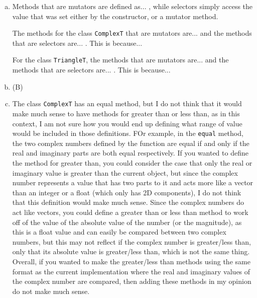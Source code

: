 \documentclass[12pt]{article}
\begin{document}
\begin{enumerate}[(a)]

\item Methods that are mutators are defined as... , while selectors simply access the value that was set either by the constructor, or a mutator method. 

The methods for the class \verb|ComplexT| that are mutators are... and the methods that are selectors are... . This is because...

For the class \verb|TriangleT|, the methods that are mutators are... and the methods that are selectors are... . This is because...

\item (B)


\item The class \verb|ComplexT| has an equal method, but I do not think that 
it would make much sense to have methods for greater than or less than, as in 
this context, I am not sure how you would end up defining what range of value 
would be included in those definitions. FOr example, in the \verb|equal| method, 
the two complex numbers defined by the function are equal if and only if the 
real and imaginary parts are both equal respectively. If you wanted to define 
the method for greater than, you could consider the case that only the real or
 imaginary value is greater than the current object, but since the complex 
 number represents a value that has two parts to it and acts more like a vector 
 than an integer or a float (which only has 2D components), I do not think that 
 this definition would make much sense. Since the complex numbers do act like 
 vectors, you could define a greater than or less than method to work off of the 
 value of the absolute value of the number (or the magnitude), as this is a float 
 value and can easily be compared between two complex numbers, but this may not 
 reflect if the complex number is greater/less than, only that its absolute 
 value is greater/less than, which is not the same thing. Overall, if you wanted 
 to make the greater/less than methods using the same format as the current 
 implementation where the real and imaginary values of the complex number are 
 compared, then adding these methods in my opinion do not make much sense. 


\end{enumerate}
\end{document}
